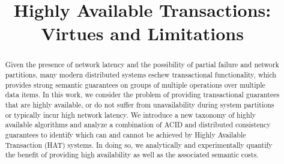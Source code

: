 \documentclass{vldb}
\begin{document}

\title{Highly Available Transactions: Virtues and Limitations}

\maketitle

\begin{abstract}
Given the presence of network latency and the possibility of partial
failure and network partitions, many modern distributed systems eschew
transactional functionality, which provides strong semantic guarantees
on groups of multiple operations over multiple data items. In this
work, we consider the problem of providing transactional guarantees
that are highly available, or do not suffer from unavailability during
system partitions or typically incur high network latency.  We
introduce a new taxonomy of highly available algorithms and analyze a
combination of ACID and distributed consistency guarantees to identify
which can and cannot be achieved by Highly Available Transaction (HAT)
systems. In doing so, we analytically and experimentally quantify the
benefit of providing high availability as well as the associated
semantic costs.
\end{abstract}



















\footnotesize
  



\end{document}
